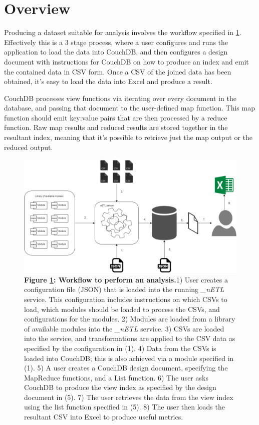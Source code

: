 \section{Overview}
Producing a dataset suitable for analysis involves the workflow specified in \ref{analysis-workflow}. Effectively this is a 3 stage process, where a user configures and runs the \textit{\nETL} application to load the data into CouchDB, and then configures a design document with instructions for CouchDB on how to produce an index and emit the contained data in CSV form. Once a CSV of the joined data has been obtained, it's easy to load the data into Excel and produce a result.

CouchDB processes view functions via iterating over every document in the database, and passing that document to the user-defined map function. This map function should emit key:value pairs that are then processed by a reduce function. Raw map results and reduced results are stored together in the resultant index, meaning that it's possible to retrieve just the map output or the reduced output.

\begin{figure}[ht]
    \centering
    \begin{mdframed}
        \centering
        \includegraphics[scale=0.35]{./resources/figures/analysis-workflow.png}
    \end{mdframed}
    \caption[Analysis Workflow]{\textbf{Figure \ref{analysis-workflow}: Workflow to perform an analysis.}1) User creates a configuration file (JSON) that is loaded into the running \textit{\_nETL} service. This configuration includes instructions on which CSVs to load, which modules should be loaded to process the CSVs, and configurations for the modules. 2) Modules are loaded from a library of available modules into the \textit{\_nETL} service. 3) CSVs are loaded into the service, and transformations are applied to the CSV data as specified by the configuration in (1). 4) Data from the CSVs is loaded into CouchDB; this is also achieved via a module specified in (1). 5) A user creates a CouchDB design document, specifying the MapReduce functions, and a List function. 6) The user asks CouchDB to produce the view index as specified by the design document in (5). 7) The user retrieves the data from the view index using the list function specified in (5). 8) The user then loads the resultant CSV into Excel to produce useful metrics.}
    \label{analysis-workflow}
\end{figure}



